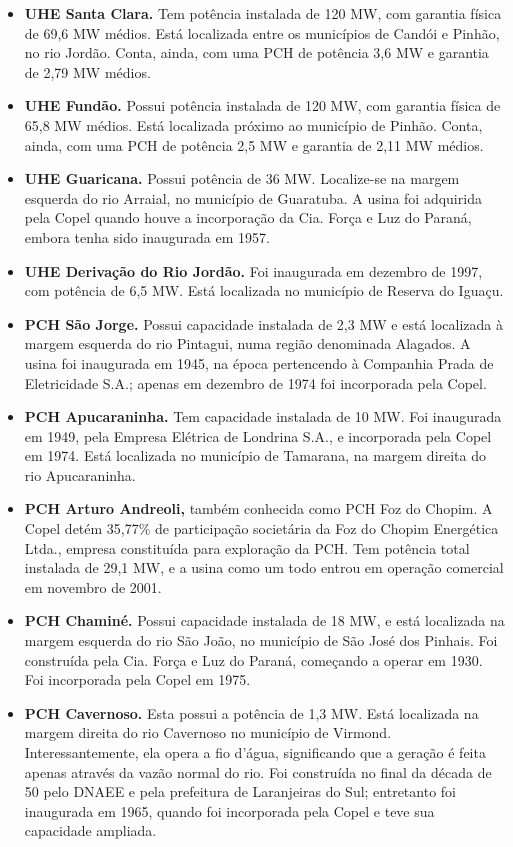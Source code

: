 \documentclass[grad,numbers]{coppe}
\begin{document}
\begin{itemize}
  \item
    \textbf{UHE Santa Clara.} Tem potência instalada de 120 MW, com garantia física de 69,6 MW médios. Está localizada entre os municípios de Candói e Pinhão, no rio Jordão. Conta, ainda, com uma PCH de potência 3,6 MW e garantia de 2,79 MW médios.
  \item
    \textbf{UHE Fundão.} Possui potência instalada de 120 MW, com garantia física de 65,8 MW médios. Está localizada próximo ao município de Pinhão. Conta, ainda, com uma PCH de potência 2,5 MW e garantia de 2,11 MW médios.
  \item
    \textbf{UHE Guaricana.} Possui potência de 36 MW. Localize-se na margem esquerda do rio Arraial, no município de Guaratuba. A usina foi adquirida pela Copel quando houve a incorporação da Cia. Força e Luz do Paraná, embora tenha sido inaugurada em 1957.
  \item
    \textbf{UHE Derivação do Rio Jordão.} Foi inaugurada em dezembro de 1997, com potência de 6,5 MW. Está localizada no município de Reserva do Iguaçu.
  \item
    \textbf{PCH São Jorge.} Possui capacidade instalada de 2,3 MW e está localizada à margem esquerda do rio Pintagui, numa região denominada Alagados. A usina foi inaugurada em 1945, na época pertencendo à Companhia Prada de Eletricidade S.A.; apenas em dezembro de 1974 foi incorporada pela Copel.
  \item
    \textbf{PCH Apucaraninha.} Tem capacidade instalada de 10 MW. Foi inaugurada em 1949, pela Empresa Elétrica de Londrina S.A., e incorporada pela Copel em 1974. Está localizada no município de Tamarana, na margem direita do rio Apucaraninha.
  \item
    \textbf{PCH Arturo Andreoli,} também conhecida como PCH Foz do Chopim. A Copel detém 35,77\% de participação societária da Foz do Chopim Energética Ltda., empresa constituída para exploração da PCH. Tem potência total instalada de 29,1 MW, e a usina como um todo entrou em operação comercial em novembro de 2001.
  \item
    \textbf{PCH Chaminé.} Possui capacidade instalada de 18 MW, e está localizada na margem esquerda do rio São João, no município de São José dos Pinhais. Foi construída pela Cia. Força e Luz do Paraná, começando a operar em 1930. Foi incorporada pela Copel em 1975.
  \item
    \textbf{PCH Cavernoso.} Esta possui a potência de 1,3 MW. Está localizada na margem direita do rio Cavernoso no município de Virmond. Interessantemente, ela opera a fio d'água, significando que a geração é feita apenas através da vazão normal do rio. Foi construída no final da década de 50 pelo DNAEE e pela prefeitura de Laranjeiras do Sul; entretanto foi inaugurada em 1965, quando foi incorporada pela Copel e teve sua capacidade ampliada.

\end{itemize}
\end{document}
